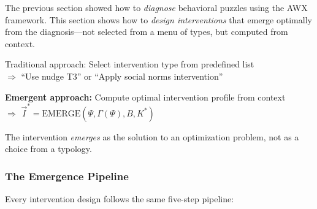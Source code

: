 

The previous section showed how to \emph{diagnose} behavioral puzzles using the AWX framework. This section shows how to \emph{design interventions} that emerge optimally from the diagnosis---not selected from a menu of types, but computed from context.

\begin{tcolorbox}[colback=blue!5!white, colframe=blue!75!black,
    title=\textbf{Key Insight: Interventions Emerge from Context}]

Traditional approach: Select intervention type from predefined list \\
$\Rightarrow$ ``Use nudge T3'' or ``Apply social norms intervention''

\textbf{Emergent approach:} Compute optimal intervention profile from context \\
$\Rightarrow$ $\vec{I}^* = \text{EMERGE}(\Psi, \Gamma(\Psi), B, K^*)$

The intervention \emph{emerges} as the solution to an optimization problem, not as a choice from a typology.

\end{tcolorbox}

\subsubsection{The Emergence Pipeline}
\label{subsubsec:emergence-pipeline}

Every intervention design follows the same five-step pipeline:

\begin{center}
\end{center}

